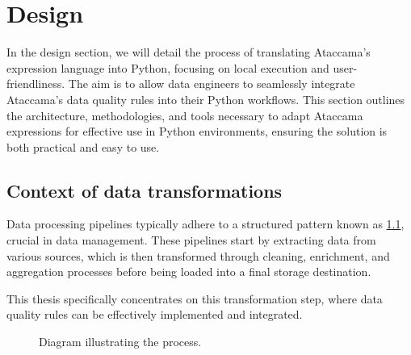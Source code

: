 
\chapter{Design}

In the design section, we will detail the process of translating Ataccama's expression language into Python, focusing on local execution and user-friendliness. The aim is to allow data engineers to seamlessly integrate Ataccama's data quality rules into their Python workflows. This section outlines the architecture, methodologies, and tools necessary to adapt Ataccama expressions for effective use in Python environments, ensuring the solution is both practical and easy to use.

\section{Context of data transformations}

Data processing pipelines typically adhere to a structured pattern known as \cite{etl}\ref{fig:etl_process}, crucial in data management. These pipelines start by extracting data from various sources, which is then transformed through cleaning, enrichment, and aggregation processes before being loaded into a final storage destination.

This thesis specifically concentrates on this transformation step, where data quality rules can be effectively implemented and integrated.

\begin{figure}[ht]
    \centering
    \caption{Diagram illustrating the  process.}
    \label{fig:etl_process}
    \end{figure}

